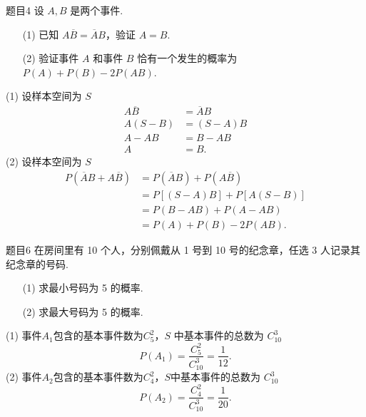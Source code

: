 \begin{question}{题目4}
    设 $A,B$ 是两个事件.
    \begin{itemize}
        \item[(1)] 已知 $A\overline{B} = \overline{A}B$，验证 $A=B$.
        \item[(2)] 验证事件 $A$ 和事件 $B$ 恰有一个发生的概率为 $P(A) + P(B) - 2P(AB)$.
    \end{itemize}
\end{question}
\begin{solution}
    (1) 设样本空间为 $S$
    $$
        \begin{aligned}
            A\overline{B}     & = \overline{A}B     \\
            A\left(S-B\right) & = \left(S-A\right)B \\
            A - AB            & = B - AB            \\
            A                 & = B.
        \end{aligned}
    $$
    (2) 设样本空间为 $S$
    $$
        \begin{aligned}
            P\left(\overline{A}B + A\overline{B}\right)
             & = P(\overline{A}B) + P(A\overline{B}) \\
             & = P[(S-A)B] + P[A(S-B)]               \\
             & = P(B - AB) + P(A - AB)               \\
             & = P(A) + P(B) - 2P(AB).
        \end{aligned}
    $$
\end{solution}

\begin{question}{题目6} 在房间里有 10 个人，分别佩戴从 1 号到 10 号的纪念章，任选 3 人记录其纪念章的号码.
    \begin{itemize}
        \item[(1)] 求最小号码为 5 的概率.
        \item[(2)] 求最大号码为 5 的概率.
    \end{itemize}
\end{question}
\begin{solution}
    (1) 事件$A_1$包含的基本事件数为$C_5^2$，$S$ 中基本事件的总数为 $C_{10}^3$
    $$
        P(A_1) = \frac{C_5^2}{C_{10}^3} = \frac{1}{12}.
    $$
    (2) 事件$A_2$包含的基本事件数为$C_4^2$，$S$中基本事件的总数为 $C_{10}^3$
    $$
        P(A_2) = \frac{C_4^2}{C_{10}^3} = \frac{1}{20}.
    $$
\end{solution}

